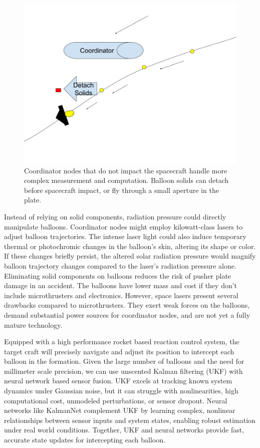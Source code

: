 \documentclass{article}
\begin{document}
\begin{figure}[htpb]
    \centering
    \includegraphics[width=0.5\linewidth]{images/Coordinator Nodes.png}
    \caption{Coordinator nodes that do not impact the spacecraft handle more complex measurement and computation.  Balloon solids can detach before spacecraft impact, or fly through a small aperture in the plate.}
    \label{fig:coordinator-nodes}
\end{figure}

Instead of relying on solid components, radiation pressure could directly manipulate balloons. Coordinator nodes might employ kilowatt-class lasers to adjust balloon trajectories. The intense laser light could also induce temporary thermal or photochromic changes in the balloon's skin, altering its shape or color. If these changes briefly persist, the altered solar radiation pressure would magnify balloon trajectory changes compared to the laser's radiation pressure alone. Eliminating solid components on balloons  reduces the risk of pusher plate damage in an accident.  The balloons have lower mass and cost if they don't include microthrusters and electronics. However, space lasers present several drawbacks compared to microthrusters. They exert weak forces on the balloons, demand substantial power sources for coordinator nodes, and are not yet a fully mature technology.  

Equipped with a high performance rocket based reaction control system, the target craft will precisely navigate and adjust its position to intercept each balloon in the formation.   Given the large number of balloons and the need for millimeter scale precision, we can use unscented Kalman filtering (UKF) \cite{wan2000unscented} with neural network based sensor fusion. UKF excels at tracking known system dynamics under Gaussian noise, but it can struggle with nonlinearities, high computational cost, unmodeled perturbations, or sensor dropout. Neural networks like KalmanNet \cite{revach_2022_kalmannet} complement UKF by learning complex, nonlinear relationships between sensor inputs and system states, enabling robust estimation under real world conditions. Together, UKF and neural networks provide fast, accurate state updates for intercepting each balloon.  
\end{document}
